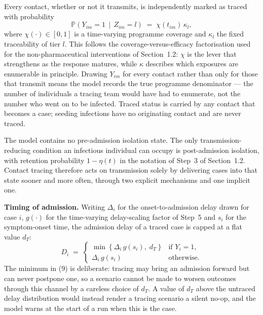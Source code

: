 \documentclass[9pt,letterpaper]{extarticle}
\newcommand{\Prob}{\mathbb{P}}
\begin{document}
Every contact, whether or not it transmits, is independently marked as traced with probability
\begin{equation}
\Prob\!\left(Y_{im} = 1 \,\middle|\, Z_{im} = l\right) \;=\; \chi(t_{im})\,\kappa_l ,
\end{equation}
where $\chi(\cdot) \in [0,1]$ is a time-varying programme coverage and $\kappa_l$ the fixed traceability of tier $l$. This follows the coverage-versus-efficacy factorisation used for the non-pharmaceutical interventions of Section~1.2: $\chi$ is the lever that strengthens as the response matures, while $\kappa$ describes which exposures are enumerable in principle. Drawing $Y_{im}$ for every contact rather than only for those that transmit means the model records the true programme denominator --- the number of individuals a tracing team would have had to enumerate, not the number who went on to be infected. Traced status is carried by any contact that becomes a case; seeding infections have no originating contact and are never traced.

The model contains no pre-admission isolation state. The only transmission-reducing condition an infectious individual can occupy is post-admission isolation, with retention probability $1 - \eta(t)$ in the notation of Step~3 of Section~1.2. Contact tracing therefore acts on transmission solely by delivering cases into that state sooner and more often, through two explicit mechanisms and one implicit one.

\textbf{Timing of admission.} Writing $\Delta_i$ for the onset-to-admission delay drawn for case $i$, $g(\cdot)$ for the time-varying delay-scaling factor of Step~5 and $s_i$ for the symptom-onset time, the admission delay of a traced case is capped at a flat value $d_T$:
\begin{equation}
D_i \;=\;
\begin{cases}
\min\!\left\{\Delta_i\, g(s_i),\; d_T\right\} & \text{if } Y_i = 1,\\
\Delta_i\, g(s_i) & \text{otherwise.}
\end{cases}
\end{equation}
The minimum in (9) is deliberate: tracing may bring an admission forward but can never postpone one, so a scenario cannot be made to worsen outcomes through this channel by a careless choice of $d_T$. A value of $d_T$ above the untraced delay distribution would instead render a tracing scenario a silent no-op, and the model warns at the start of a run when this is the case.
\end{document}
